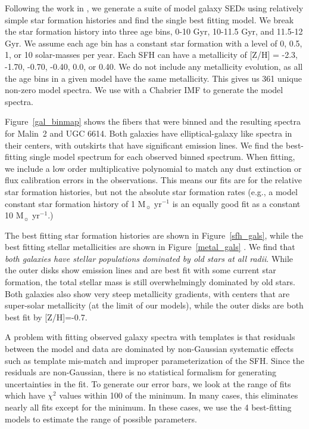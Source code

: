 \documentclass[12pt,preprint]{aastex}
\begin{document}
Following the work in \citet{Yoachim10,Yoachim12}, we generate a suite of model galaxy SEDs using relatively simple star formation histories and find the single best fitting model.
We break the star formation history into three age bins, 0-10 Gyr, 10-11.5 Gyr, and 11.5-12 Gyr.
We assume each age bin has a constant star formation with a level of 0, 0.5, 1, or 10 solar-masses per year.
Each SFH can have a metallicity of [Z/H] = -2.3, -1.70, -0.70, -0.40, 0.0, or 0.40.
We do not include any metallicity evolution, as all the age bins in a given model have the same metallicity.
This gives us 361 unique non-zero model spectra. We use \citet{Bruzual03} with a Chabrier IMF to generate the model spectra. 
  

Figure~\ref{gal_binmap} shows the fibers that were binned and the resulting spectra for Malin~2 and UGC 6614.
Both galaxies have elliptical-galaxy like spectra in their centers, with outskirts that have significant emission lines.
We find the best-fitting single model spectrum for each observed binned spectrum. When fitting, we include a low order multiplicative polynomial to match any dust extinction or flux calibration errors in the observations.
This means our fits are for the relative star formation histories, but not the absolute star formation rates (e.g., a model constant star formation history of 1 M$_\sun$ yr$^{-1}$ is an equally good fit as a constant 10 M$_\sun$ yr$^{-1}$.)


The best fitting star formation histories are shown in Figure~\ref{sfh_gals}, while the best fitting stellar metallicities are shown in Figure~\ref{metal_gals} .
We find that {\emph{both galaxies have stellar populations dominated by old stars at all radii}}.
While the outer disks show emission lines and are best fit with some current star formation, the total stellar mass is still overwhelmingly dominated by old stars.
Both galaxies also show very steep metallicity gradients, with centers that are super-solar metallicity (at the limit of our models), while the outer disks are both best fit by [Z/H]=-0.7.


A problem with fitting observed galaxy spectra with templates is that residuals between the model and data are dominated by non-Gaussian systematic effects such as template mis-match and improper parameterization of the SFH.
Since the residuals are non-Gaussian, there is no statistical formalism for generating uncertainties in the fit.
To generate our error bars, we look at the range of fits which have $\chi^2$ values within 100 of the minimum.
In many cases, this eliminates nearly all fits except for the minimum.
In these cases, we use the 4 best-fitting models to estimate the range of possible parameters.
\end{document}
